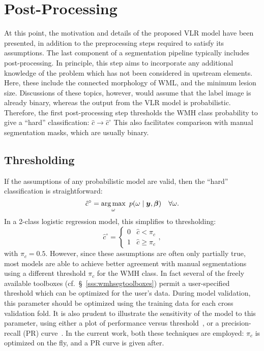 \section{Post-Processing}\label{s:vlr-post}
At this point, the motivation and details of the proposed VLR model have been presented,
in addition to the preprocessing steps required to satisfy its assumptions.
The last component of a segmentation pipeline typically includes post-processing. 
In principle, this step aims to incorporate any additional knowledge of the problem
which has not been considered in upstream elements.
Here, these include the connected morphology of WML, and the minimum lesion size.
Discussions of these topics, however, would assume that the label image is already binary,
whereas the output from the VLR model is probabilistic.
Therefore, the first post-processing step
thresholds the WMH class probability to give a ``hard'' classification:
$\hat{c}\rightarrow \hat{c}^{\circ}$
This also facilitates comparison with manual segmentation masks, which are usually binary.
\subsection{Thresholding}\label{ss:vlr-thr}
If the assumptions of any probabilistic model are valid,
then the ``hard'' classification is straightforward:
\begin{equation}
  \hat{c}^{\circ} = \underset{\omega}{\arg\max}\enspace p(\omega\mid\bm{y},\bm{\beta})\quad\forall \omega.
\end{equation}
In a 2-class logistic regression model, this simplifies to thresholding:
\begin{equation}
  \hat{c}^{\circ} = \begin{cases} 0 & \hat{c} < \pi_c \\ 1 & \hat{c} \ge \pi_c \end{cases},
\end{equation}
with $\pi_c = 0.5$.
However, since these assumptions are often only partially true,
most models are able to achieve better agreement with manual segmentations
using a different threshold $\pi_c$ for the WMH class.
In fact several of the freely available toolboxes (cf.~\S~\ref{sss:wmhsegtoolboxes})
permit a user-specified threshold which can be optimized for the user's data.
During model validation,
this parameter should be optimized using the training data for each cross validation fold.
It is also prudent to illustrate the sensitivity of the model to this parameter, using either 
a plot of performance versus threshold~\cite{Steenwijk2013}, or
a precision-recall (PR) curve~\cite{Arbelaez2011}.
In the current work, both these techniques are employed:
$\pi_c$ is optimized on the fly, and a PR curve is given after.
